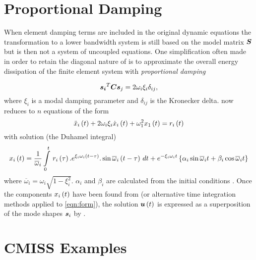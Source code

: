 \section{Proportional Damping}

When element damping terms are included in the original dynamic equations
 the transformation to a lower bandwidth system is still based
on the model matrix $\matr{S}$ but  is then not a system of
uncoupled equations. One simplification often made in order to retain the
diagonal nature of  is to approximate the overall energy
dissipation of the finite element system with \emph{proportional damping}

\begin{equation}
  \transpose{\vect{{s}_{i}}}\matr{C}\vect{s}_{j} = 2\omega_{i}\xi_{i}\delta_{ij},
 \label{eqn:propd}
\end{equation}
where $\xi_{i}$ is a modal damping parameter and $\delta_{ij}$ is the
Kronecker delta.  now reduces to $n$ equations of the
form
\begin{equation}
   \ddot{x}_{i}\left( t \right)  + 2 \omega_{i}\xi_{i} \dot{x}_{i}\left( t \right)  +
  \omega_{1}^{2} x_{1}\left( t \right)  =  r_{i}\left( t \right) 
 \label{eqn:form}
\end{equation}
with solution (the Duhamel integral)
\begin{equation}
   x_{i}\left( t \right) =\dfrac{1}{\overline{\omega}_{i}}  \displaystyle\int\limits_{0}^{t} \, r_{i}\left( \tau \right) .e^{\xi_{i}\omega_{i}\left( t-\tau \right)}.
  \sin \overline{\omega}_{i}\left( t-\tau \right) \,dt 
  +e^{-\xi_{i}\omega_{i}t}\left\{ \alpha_{i}\sin\overline{\omega}_{i}t
    +\beta_{i}\cos\overline{\omega}_{i}t \right\}
 \label{eqn:calc}
\end{equation}
where $\overline{\omega}_{i}=\omega_{i}\sqrt{1-\xi_{i}^{2}}$. $\alpha_{i}$ and
$\beta_{i}$ are calculated from the initial conditions .
Once the components $ x_{i}\left( t \right) $ have been found from  (or
alternative time integration methods applied to \eqref{eqn:form}), the
solution $\fnof{\vect{u}}{t}$ is expressed as a superposition of the mode shapes 
$\vect{s}_{i}$ by .

\section{CMISS Examples}


